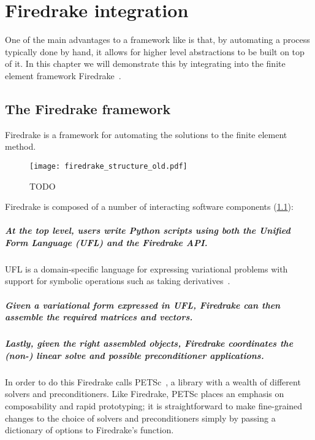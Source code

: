 \documentclass[thesis]{subfiles}
\begin{document}
\chapter{Firedrake integration}
\label{chapter:firedrake}

One of the main advantages to a framework like  is that, by automating a process typically done by hand, it allows for higher level abstractions to be built on top of it.
In this chapter we will demonstrate this by integrating  into the finite element framework Firedrake~\cite{FiredrakeUserManual}.

\section{The Firedrake framework}

Firedrake is a framework for automating the solutions to the finite element method.

\begin{figure}
  \texttt{[image: firedrake\_structure\_old.pdf]}
  \caption{TODO}
  \label{fig:firedrake_structure_old}
\end{figure}

Firedrake is composed of a number of interacting software components (\cref{fig:firedrake_structure_old}):

\paragraph{At the top level, users write Python scripts using both the Unified Form Language (UFL) and the Firedrake API.}
UFL is a domain-specific language for expressing variational problems with support for symbolic operations such as taking derivatives~\cite{alnaesUnifiedFormLanguage2014a}.

\paragraph{Given a variational form expressed in UFL, Firedrake can then assemble the required matrices and vectors.}

\paragraph{Lastly, given the right assembled objects, Firedrake coordinates the (non-) linear solve and possible preconditioner applications.}
In order to do this Firedrake calls PETSc~\cite{petsc-user-ref,petsc-web-page,petsc-efficient}, a library with a wealth of different solvers and preconditioners.
Like Firedrake, PETSc places an emphasis on composability and rapid prototyping; it is straightforward to make fine-grained changes to the choice of solvers and preconditioners simply by passing a dictionary of options to Firedrake's  function.
\end{document}
